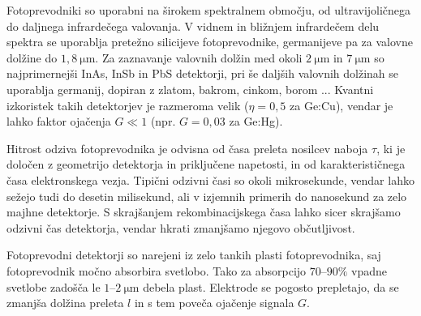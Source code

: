 %  

Fotoprevodniki so uporabni na širokem spektralnem območju, od ultra\-vijoličnega
do daljnega infra\-rdečega valovanja. 
V vidnem in bližnjem infrardečem delu spektra se 
uporablja pretežno silicijeve fotoprevodnike, germanijeve
pa za valovne dolžine do $1,8~\si{\micro\meter}$. Za zaznavanje valovnih dolžin med okoli 
$2~\si{\micro\meter}$ in $7~\si{\micro\meter}$ so najprimernejši InAs, InSb in PbS detektorji, 
pri še daljših valovnih dolžinah se uporablja germanij, dopiran z zlatom, bakrom, cinkom, borom ...
Kvantni izkoristek takih detektorjev je razmeroma velik ($\eta = 0,5$ za Ge:Cu), vendar
je lahko faktor ojačenja $G \ll 1$ (npr. $G = 0,03$ za Ge:Hg). 

Hitrost odziva fotoprevodnika je odvisna od časa preleta nosilcev naboja $\tau$,
ki je določen z geometrijo detektorja in priključene napetosti, 
in od karakterističnega časa elektronskega vezja. 
Tipični odzivni časi so okoli mikrosekunde, vendar lahko sežejo
tudi do desetin milisekund, ali v izjemnih primerih do nanosekund za zelo majhne detektorje.
S skrajšanjem rekombinacijskega časa lahko sicer skrajšamo odzivni čas detektorja, 
vendar hkrati zmanjšamo njegovo občutljivost.

\begin{remark}
Fotoprevodni detektorji so narejeni iz zelo tankih plasti fotoprevodnika, saj fotoprevodnik močno absorbira
svetlobo. Tako za absorpcijo $70$--$90\%$ vpadne svetlobe zadošča le $1$--$2~\si{\micro\meter}$ debela plast.
Elektrode se pogosto prepletajo, da se zmanjša dolžina preleta $l$ in s tem poveča ojačenje signala $G$. 
\end{remark}

